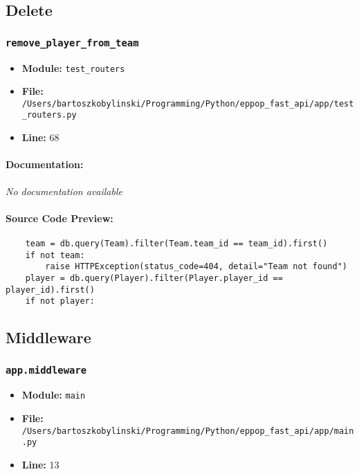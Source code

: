 \documentclass[11pt,a4paper]{article}
\begin{document}
\vspace{1em}
\subsection{Delete}

\subsubsection{\texttt{remove\_player\_from\_team}}

\begin{itemize}
    \item \textbf{Module:} \texttt{test\_routers}
    \item \textbf{File:} \texttt{/Users/bartoszkobylinski/Programming/Python/eppop\_fast\_api/app/test\_routers.py}
    \item \textbf{Line:} 68
\end{itemize}

\paragraph{Documentation:} \textit{No documentation available}

\paragraph{Source Code Preview:}
\begin{verbatim}
    team = db.query(Team).filter(Team.team_id == team_id).first()
    if not team:
        raise HTTPException(status_code=404, detail="Team not found")
    player = db.query(Player).filter(Player.player_id == player_id).first()
    if not player:
\end{verbatim}

\vspace{1em}
\subsection{Middleware}

\subsubsection{\texttt{app.middleware}}

\begin{itemize}
    \item \textbf{Module:} \texttt{main}
    \item \textbf{File:} \texttt{/Users/bartoszkobylinski/Programming/Python/eppop\_fast\_api/app/main.py}
    \item \textbf{Line:} 13
\end{itemize}
\end{document}
